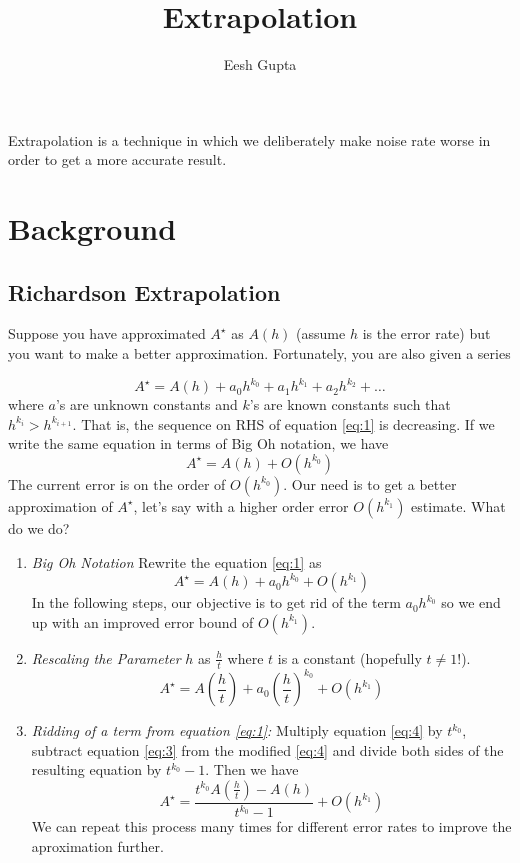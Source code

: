 \documentclass{article}
\title{Extrapolation}
\author{Eesh Gupta}
\begin{document}
\maketitle
\tableofcontents
\newpage

Extrapolation is a technique in which we deliberately make noise rate worse in
order to get a more accurate result.
\section{Background}
\subsection{Richardson Extrapolation}
Suppose you have approximated \(A^\star\) as \(A(h)\) (assume \(h\) is
the error rate) but you want to make
a better approximation. Fortunately, you are also given a series

\begin{equation} \label{eq:1}
  A^\star = A(h) + a_0h^{k_0} + a_1h^{k_1} + a_2h^{k_2} + \ldots
\end{equation}
where \(a\)'s are unknown constants and \(k\)'s are known constants such that
\(h^{k_i} > h^{k_{i+1}}\). That is, the sequence on RHS of equation \ref{eq:1} is
decreasing. If we write the same equation in terms of Big Oh notation,
we have
\begin{equation} \label{eq:2}
  A^\star = A(h) + O(h^{k_0})
\end{equation}
The current error is on the order of \(O(h^{k_0})\).
Our need is to get a better approximation of \(A^\star\), let's say with
a higher order error \(O(h^{k_1})\) estimate. What do we do?
\begin{enumerate}
  \item \textit{Big Oh Notation} Rewrite the equation \ref{eq:1} as
  \begin{equation} \label{eq:3}
    A^\star = A(h) + a_0h^{k_0} + O(h^{k_1})
  \end{equation}
  In the following steps, our objective is to get rid of the term
   \(a_0h^{k_0}\) so we end up with an improved error bound of
   \(O(h^{k_1})\).
  \item \textit{Rescaling the Parameter} \(h\) as \(\frac{h}{t}\) where
  \(t\) is a constant (hopefully \(t \neq 1\)!).
  \begin{equation} \label{eq:4}
    A^\star = A(\frac{h}{t}) + a_0(\frac{h}{t})^{k_0} + O(h^{k_1})
  \end{equation}


  \item \textit{Ridding of a term from equation \ref{eq:1}:} Multiply equation \ref{eq:4} by
  \(t^{k_0}\), subtract equation \ref{eq:3} from the modified \ref{eq:4} and divide
  both sides of the resulting equation by \(t^{k_0} -1 \). Then we have
  \begin{equation} \label{eq:5}
    A^\star = \frac{t^{k_0}A(\frac{h}{t}) -A(h)}{t^{k_0} -1} + O(h^{k_1})
  \end{equation}
  We can repeat this process many times for different error rates to improve
  the aproximation further.
\end{enumerate}
\end{document}
